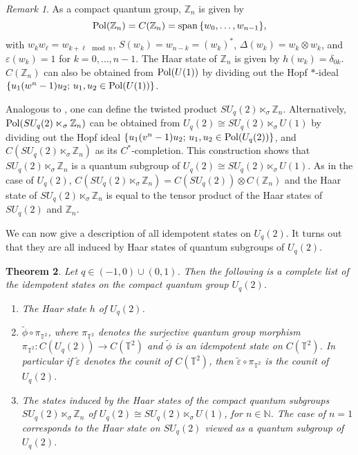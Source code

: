 \documentclass[12pt]{amsart}
\newtheorem{theorem}{Theorem}[section]
\theoremstyle{definition}
\theoremstyle{remark}
\newtheorem{remark}[theorem]{Remark}
\numberwithin{equation}{section}
\begin{document}
\begin{remark}
As a compact quantum group, $\mathbb{Z}_n$ is given by
\[
{\rm Pol}(\mathbb{Z}_n)=C(\mathbb{Z}_n)={\rm
  span}\,\{w_0,\ldots,w_{n-1}\},
\]
with $w_kw_\ell =
w_{k+\ell\!\mod n}$, $S(w_k)=w_{n-k}=(w_k)^*$, $\Delta(w_k)=w_k\otimes w_k$, and
$\varepsilon(w_k)=1$ for $k=0,\ldots, n-1$. The Haar state of $\mathbb{Z}_n$
is given by $h(w_k)=\delta_{0k}$. $C(\mathbb{Z}_n)$ can also be obtained from ${\rm
  Pol}(U(1))$ by dividing out the Hopf $*$-ideal $\{u_1(w^n-1)u_2;\,
u_1,u_2\in {\rm Pol}(U(1))\}$.

Analogous to \cite[Section 4]{wysoczanski04},
one can define the twisted product $SU_q(2)\ltimes_\sigma
\mathbb{Z}_n$. Alternatively, ${\rm Pol}(SU_q(2)\ltimes_\sigma \mathbb{Z}_n)$
can be obtained from $U_q(2)\cong SU_q(2)\ltimes_\sigma U(1)$ by
dividing out the Hopf ideal $\{u_1(v^n-1)u_2;\,u_1,u_2\in {\rm
  Pol}(U_q(2))\}$, and $C(SU_q(2)\ltimes_\sigma \mathbb{Z}_n)$ as its
$C^*$-completion. This construction shows that $SU_q(2)\ltimes_\sigma \mathbb{Z}_n$ is a quantum subgroup of 
$U_q(2)\cong SU_q(2)\ltimes_\sigma U(1)$. As in the case of $U_q(2)$, $C(SU_q(2)\ltimes_\sigma 
\mathbb{Z}_n)=C(SU_q(2))\otimes C(\mathbb{Z}_n)$ and the Haar state of $SU_q(2)\ltimes_\sigma \mathbb{Z}_n$ is 
equal to the tensor product of the Haar states of $SU_q(2)$ and $\mathbb{Z}_n$.
\end{remark}

We can now give a description of all idempotent states on $U_q(2)$. It turns
out that they are all induced by Haar states of quantum subgroups of $U_q(2)$.

\begin{theorem}\label{theo-uq2}
Let $q\in(-1,0)\cup(0,1)$. Then the following is a complete list of the idempotent states on the
compact quantum group $U_q(2)$.
\begin{enumerate}
\item
The Haar state $h$ of $U_q(2)$.
\item
$\tilde{\phi}\circ\pi_{\mathbb{T}^2}$, where $\pi_{\mathbb{T}^2}$ denotes the
  surjective quantum group morphism $\pi_{\mathbb{T}^2}:C(U_q(2))\to
    C(\mathbb{T}^2)$ and $\tilde{\phi}$ is an idempotent state on
    $C(\mathbb{T}^2)$. In particular if $\widetilde{\varepsilon}$ denotes the counit of  $C(\mathbb{T}^2)$, then
   $\widetilde{\varepsilon}\circ\pi_{\mathbb{T}^2}$ is the counit of $U_q(2)$.
\item
The states induced by the Haar states of the compact quantum subgroups $SU_q(2)\ltimes_\sigma
\mathbb{Z}_n$ of $U_q(2)\cong SU_q(2)\ltimes_\sigma U(1)$, for $n\in \mathbb{N}$. The case of $n
=1$ corresponds to the Haar state on $SU_q(2)$ viewed as a quantum subgroup of $U_q(2)$.
\end{enumerate}
\end{theorem}
\end{document}
